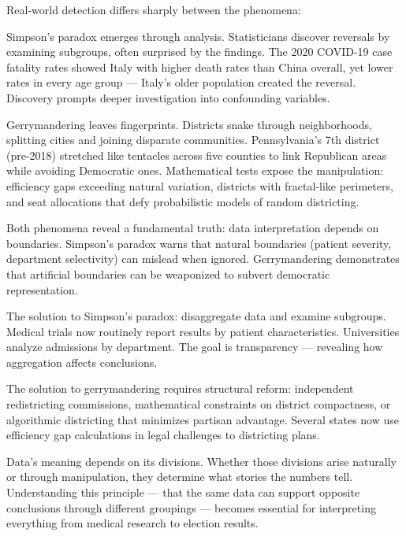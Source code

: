 Real-world detection differs sharply between the phenomena:

Simpson's paradox emerges through analysis. Statisticians discover reversals by examining subgroups, often surprised by the findings. The 2020 COVID-19 case fatality rates showed Italy with higher death rates than China overall, yet lower rates in every age group — Italy's older population created the reversal. Discovery prompts deeper investigation into confounding variables.

Gerrymandering leaves fingerprints. Districts snake through neighborhoods, splitting cities and joining disparate communities. Pennsylvania's 7th district (pre-2018) stretched like tentacles across five counties to link Republican areas while avoiding Democratic ones. Mathematical tests expose the manipulation: efficiency gaps exceeding natural variation, districts with fractal-like perimeters, and seat allocations that defy probabilistic models of random districting.

Both phenomena reveal a fundamental truth: data interpretation depends on boundaries. Simpson's paradox warns that natural boundaries (patient severity, department selectivity) can mislead when ignored. Gerrymandering demonstrates that artificial boundaries can be weaponized to subvert democratic representation.

The solution to Simpson's paradox: disaggregate data and examine subgroups. Medical trials now routinely report results by patient characteristics. Universities analyze admissions by department. The goal is transparency — revealing how aggregation affects conclusions.

The solution to gerrymandering requires structural reform: independent redistricting commissions, mathematical constraints on district compactness, or algorithmic districting that minimizes partisan advantage. Several states now use efficiency gap calculations in legal challenges to districting plans.

Data's meaning depends on its divisions. Whether those divisions arise naturally or through manipulation, they determine what stories the numbers tell. Understanding this principle — that the same data can support opposite conclusions through different groupings — becomes essential for interpreting everything from medical research to election results.


\vspace*{\fill}

\clearpage




